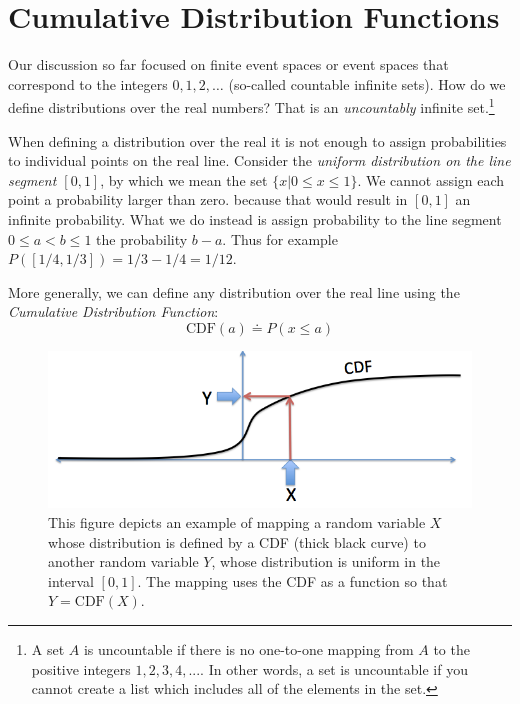 \documentclass{report}
\theoremstyle{plain}
\theoremstyle{definition}
\begin{document}
\lecturer{}
\scribe{}

\maketitle
\section{Cumulative Distribution Functions}

Our discussion so far focused on finite event spaces or event spaces
that correspond to the integers $0,1,2,\ldots$ (so-called countable
infinite sets). How do we define distributions over the real numbers?
That is an {\em uncountably} infinite set.\footnote{A set $A$ is
  uncountable if there is no one-to-one mapping from $A$ to the
  positive integers $1,2,3,4,...$. In other words, a set is
  uncountable if you cannot create a list which includes all of the
  elements in the set.}

When defining a distribution over the real it is not enough to assign
probabilities to individual points on the real line. Consider the {\em
  uniform distribution on the line segment $[0,1]$}, by which
we mean the set $\{x | 0 \leq x \leq 1\}$. We cannot assign each
point a probability larger than zero. because that would result in
$[0,1]$ an infinite probability. What we do instead is assign
probability to the line segment $0 \leq a < b \leq 1$ the probability
$b-a$. Thus for example $P([1/4,1/3])=1/3-1/4 = 1/12$.

More generally, we can define any distribution over the real line
using the {\em Cumulative Distribution Function}:
\newcommand{\CDF}{\mbox{CDF}}
\[
\CDF(a) \doteq P(x \leq a)
\]

\begin{figure}[th]
\begin{center}
\includegraphics[width=5in]{figs/CDFmapping.png}
\end{center}
\caption{This figure depicts an example of mapping a random variable
  $X$ whose distribution is defined by a CDF (thick black curve) to
  another random variable $Y$, whose distribution is uniform in the
  interval $[0,1]$. The mapping uses the CDF as a function so that
  $Y=\CDF(X)$. \label{fig:CDFmap}}
\end{figure}
\end{document}
